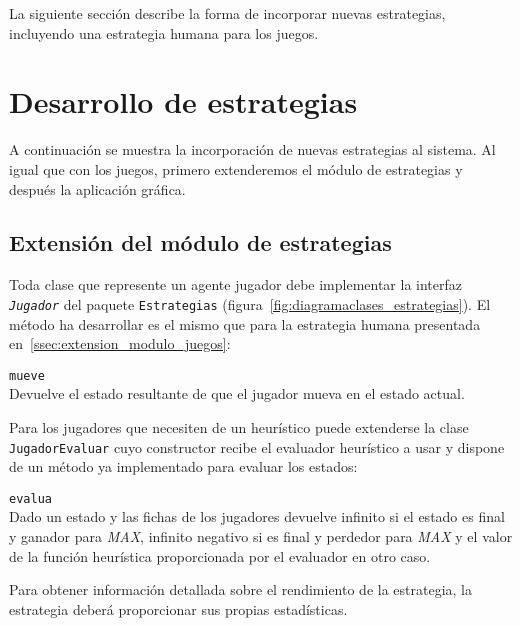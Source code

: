 \bigskip
La siguiente sección describe la forma de incorporar nuevas estrategias, incluyendo una estrategia humana para los juegos.

\section{Desarrollo de estrategias}
\label{sec:desarrollo_estrategias}
A continuación se muestra la incorporación de nuevas estrategias al sistema.
Al igual que con los juegos, primero extenderemos el módulo de estrategias y después la aplicación gráfica.

\subsection{Extensión del módulo de estrategias}
\label{ssec:extension_modulo_estrategias}
Toda clase que represente un agente jugador debe implementar la interfaz \texttt{\textit{Jugador}} del paquete \texttt{Estrategias} (figura~\ref{fig:diagramaclases_estrategias}).
El método ha desarrollar es el mismo que para la estrategia humana presentada en~\ref{ssec:extension_modulo_juegos}:

\begin{description}
	\item \texttt{mueve} \\
	Devuelve el estado resultante de que el jugador mueva en el estado actual.
\end{description}

Para los jugadores que necesiten de un heurístico puede extenderse la clase \texttt{JugadorEvaluar} cuyo constructor recibe el evaluador heurístico a usar y dispone de un método ya implementado para evaluar los estados:

\begin{description}
	\item \texttt{evalua} \\
	Dado un estado y las fichas de los jugadores devuelve infinito si el estado es final y ganador para \textit{MAX}, infinito negativo si es final y perdedor para \textit{MAX} y el valor de la función heurística proporcionada por el evaluador en otro caso.
\end{description}

\bigskip
Para obtener información detallada sobre el rendimiento de la estrategia, la estrategia deberá proporcionar sus propias estadísticas.

